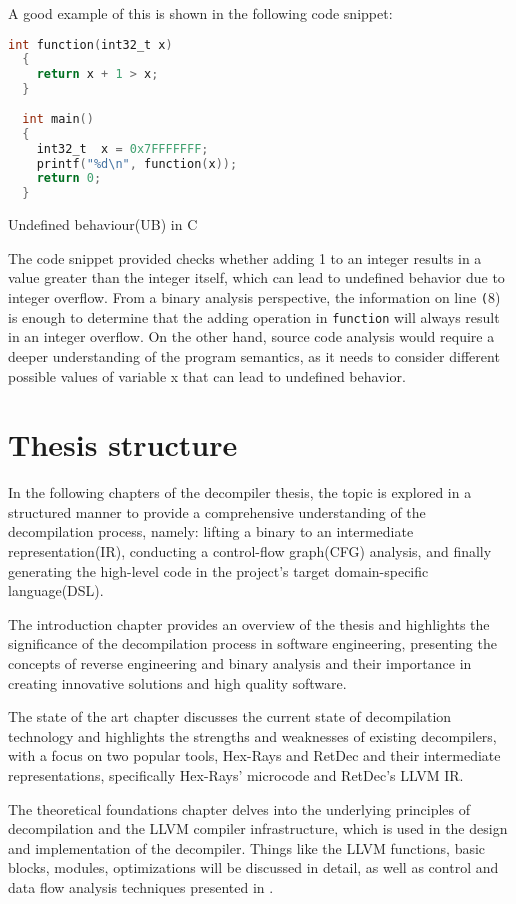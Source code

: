 A good example of this is shown in the following code snippet:
\begin{code}
	\begin{lstlisting}[language=C]
  int function(int32_t x)
  {
    return x + 1 > x;
  }
  
  int main()
  {
    int32_t  x = 0x7FFFFFFF;
    printf("%d\n", function(x));
    return 0;
  }
	\end{lstlisting}
	\caption{Undefined behaviour(UB) in C}
	\label{code:polym3}
\end{code}

The code snippet provided checks whether adding 1 to an integer results in a value greater than 
the integer itself, which can lead to undefined behavior due to integer overflow. From a binary
analysis perspective, the information on line \texttt(8) is enough to determine that the adding
operation in \texttt{function} will always result in an integer overflow. On the other hand, 
source code analysis would require a deeper understanding of the program semantics, as it needs
to consider different possible values of variable x that can lead to undefined behavior.

\section{Thesis structure}
In the following chapters of the decompiler thesis, the topic is explored in a structured manner
to provide a comprehensive understanding of the decompilation process, namely: lifting a binary
to an intermediate representation(IR), conducting a control-flow graph(CFG) analysis, and finally
generating the high-level code in the project's target domain-specific language(DSL).

The introduction chapter provides an overview of the thesis and highlights the significance of
the decompilation process in software engineering, presenting the concepts of reverse engineering
and binary analysis and their importance in creating innovative solutions and high quality software.

The state of the art chapter discusses the current state of decompilation technology and highlights
the strengths and weaknesses of existing decompilers, with a focus on two popular tools, Hex-Rays
and RetDec and their intermediate representations, specifically Hex-Rays' microcode and RetDec's
LLVM IR.

The theoretical foundations chapter delves into the underlying principles of decompilation and the
LLVM compiler infrastructure, which is used in the design and implementation of the decompiler.
Things like the LLVM functions, basic blocks, modules, optimizations will be discussed in detail, as
well as control and data flow analysis techniques presented in \cite{cifuentes}.


